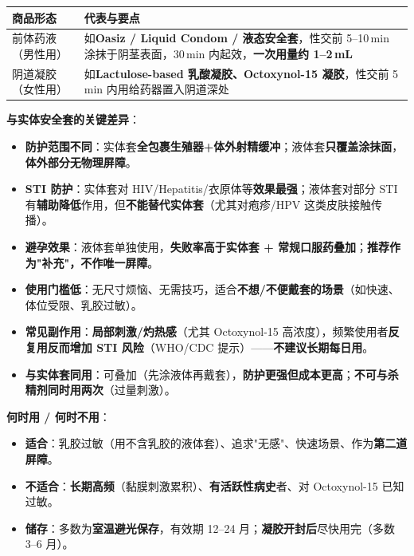 \documentclass[12pt,UTF8,openany]{ctexbook}
\begin{document}
\begin{center}
\footnotesize
\begin{tabularx}{\textwidth}{lX}
\toprule
\textbf{商品形态} & \textbf{代表与要点} \\
\midrule
前体药液（男性用） & 如\textbf{Oasiz / Liquid Condom / 液态安全套}，性交前 5--10\,min 涂抹于阴茎表面，30\,min 内起效，\textbf{一次用量约 1--2\,mL} \\
阴道凝胶（女性用） & 如\textbf{Lactulose-based 乳酸凝胶、Octoxynol-15 凝胶}，性交前 5\,min 内用给药器置入阴道深处 \\
\bottomrule
\end{tabularx}
\end{center}

\noindent \textbf{与实体安全套的关键差异}：

\begin{itemize}[leftmargin=2em,itemsep=0.3em]
  \item \textbf{防护范围不同}：实体套\textbf{全包裹生殖器+体外射精缓冲}；液体套\textbf{只覆盖涂抹面}，\textbf{体外部分无物理屏障}。
  \item \textbf{STI 防护}：实体套对 HIV/Hepatitis/衣原体等\textbf{效果最强}；液体套对部分 STI 有\textbf{辅助降低}作用，但\textbf{不能替代实体套}（尤其对疱疹/HPV 这类皮肤接触传播）。
  \item \textbf{避孕效果}：液体套单独使用，\textbf{失败率高于实体套 + 常规口服药叠加}；\textbf{推荐作为"补充"，不作唯一屏障}。
  \item \textbf{使用门槛低}：无尺寸烦恼、无需技巧，适合\textbf{不想/不便戴套的场景}（如快速、体位受限、乳胶过敏）。
  \item \textbf{常见副作用}：\textbf{局部刺激/灼热感}（尤其 Octoxynol-15 高浓度），频繁使用者\textbf{反复用反而增加 STI 风险}（WHO/CDC 提示）——\textbf{不建议长期每日用}。
  \item \textbf{与实体套同用}：可叠加（先涂液体再戴套），\textbf{防护更强但成本更高}；\textbf{不可与杀精剂同时用两次}（过量刺激）。
\end{itemize}

\noindent \textbf{何时用 / 何时不用}：

\begin{itemize}[leftmargin=2em,itemsep=0.3em]
  \item \textbf{适合}：乳胶过敏（用不含乳胶的液体套）、追求"无感"、快速场景、作为\textbf{第二道屏障}。
  \item \textbf{不适合}：\textbf{长期高频}（黏膜刺激累积）、\textbf{有活跃性病史}者、对 Octoxynol-15 已知过敏。
  \item \textbf{储存}：多数为\textbf{室温避光保存}，有效期 12--24 月；\textbf{凝胶开封后}尽快用完（多数 3--6 月）。
\end{itemize}
\end{document}

